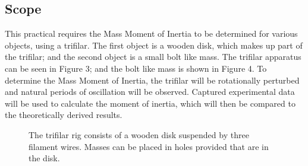 \documentclass[a4paper]{article}
\begin{document}
\subsection{Scope}
This practical requires the Mass Moment of Inertia to be determined for various objects, using a trifilar. The first object is a wooden disk, which makes up part of the trifilar; and the second object is a small bolt like mass. The trifilar apparatus can be seen in Figure 3; and the bolt like mass is shown in Figure 4. To determine the Mass Moment of Inertia, the trifilar will be rotationally perturbed and natural periods of oscillation will be observed. Captured experimental data will be used to calculate the moment of inertia, which will then be compared to the theoretically derived results.
\begin{figure}[h]
	\centering
	\begin{minipage}{0.45\textwidth}
		\centering
		\caption{The trifilar rig consists of a wooden disk suspended by three filament wires. Masses can be placed in holes provided that are in the disk.}

\end{minipage}
\end{figure}
\end{document}
